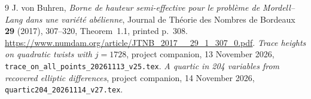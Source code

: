 \documentclass[11pt,a4paper]{article}
\begin{document}
\begin{thebibliography}{9}
 J. von Buhren, \emph{Borne de hauteur semi-effective pour
le probl\`eme de Mordell--Lang dans une vari\'et\'e ab\'elienne},
Journal de Th\'eorie des Nombres de Bordeaux \textbf{29} (2017),
307--320, Theorem~1.1, printed p.~308.
\url{https://www.numdam.org/article/JTNB_2017__29_1_307_0.pdf}.
 \emph{Trace heights on quadratic twists with $j=1728$},
project companion, 13 November 2026,
\nolinkurl{trace_on_all_points_20261113_v25.tex}.
 \emph{A quartic in 204 variables from recovered elliptic differences},
project companion, 14 November 2026,
\nolinkurl{quartic204_20261114_v27.tex}.
\end{thebibliography}
\end{document}
